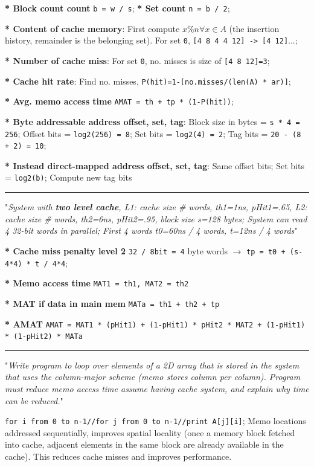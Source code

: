 \documentclass[a4paper]{article}
\begin{document}
\begin{multicols*}{2}
  \textbf{* Block count count} \texttt{b = w / s};
  \textbf{* Set count} \texttt{n = b / 2};

  \textbf{* Content of cache memory}: First compute $x\%n \forall x \in A$ (the insertion history, remainder is the belonging set). For set \texttt{0}, \texttt{[4 8 4 4 12] -> [4 12]}...;

  \textbf{* Number of cache miss}: For set \texttt{0}, no. misses is size of \texttt{[4 8 12]=3};

  \textbf{* Cache hit rate}: Find no. misses, \texttt{P(hit)=1-[no.misses/(len(A) * ar)]};

  \textbf{* Avg. memo access time} \texttt{AMAT = th + tp * (1-P(hit))};

  \textbf{* Byte addressable address offset, set, tag}: Block size in bytes = \texttt{s * 4 = 256}; Offset bits = \texttt{log2(256) = 8}; Set bits = \texttt{log2(4) = 2}; Tag bits = \texttt{20 - (8 + 2) = 10};

  \textbf{* Instead direct-mapped address offset, set, tag}: Same offset bits; Set bits = \texttt{log2(b)}; Compute new tag bits

  \rule{1\linewidth}{0.4pt}

  "\textit{System with \textbf{two level cache}, L1: cache size \# words, th1=1ns, pHit1=.65, L2: cache size \# words, th2=6ns, pHit2=.95, block size s=128 bytes; System can read 4 32-bit words in parallel; First 4 words t0=60ns / 4 words, t=12ns / 4 words}"

  \textbf{* Cache miss penalty level 2} \texttt{32 / 8bit = 4} byte words $\to$ \texttt{tp = t0 + (s-4*4) * t / 4*4};

  \textbf{* Memo access time} \texttt{MAT1 = th1, MAT2 = th2}

  \textbf{* MAT if data in main mem} \texttt{MATa = th1 + th2 + tp}

  \textbf{* AMAT} \texttt{AMAT = MAT1 * (pHit1) + (1-pHit1) * pHit2 * MAT2 + (1-pHit1) * (1-pHit2) * MATa}

  \rule{1\linewidth}{0.4pt}

  "\textit{Write program to loop over elements of a 2D array that is stored in the system that uses the column-major scheme (memo stores column per column). Program must reduce memo access time assume having cache system, and explain why time can be reduced.}"

  \texttt{for i from 0 to n-1//for j from 0 to n-1//print A[j][i]}; Memo locations addressed sequentially, improves spatial locality (once a memory block fetched into cache, adjacent elements in the same block are already available in the cache). This reduces cache misses and improves performance.


\end{multicols*}
\end{document}
